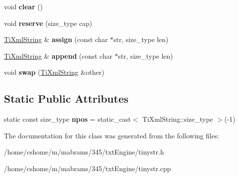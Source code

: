 \begin{DoxyCompactItemize}
\item 
\hypertarget{class_ti_xml_string_ab20e06e4c666abf3bdbfb3a1191d4888}{
void {\bfseries clear} ()}
\label{class_ti_xml_string_ab20e06e4c666abf3bdbfb3a1191d4888}

\item 
\hypertarget{class_ti_xml_string_a88ecf9f0f00cb5c67b6b637958d7049c}{
void {\bfseries reserve} (size\-\_\-type cap)}
\label{class_ti_xml_string_a88ecf9f0f00cb5c67b6b637958d7049c}

\item 
\hypertarget{class_ti_xml_string_ac72f3d9149b7812c1e6c59402014d0d5}{
\hyperlink{class_ti_xml_string}{\-Ti\-Xml\-String} \& {\bfseries assign} (const char $\ast$str, size\-\_\-type len)}
\label{class_ti_xml_string_ac72f3d9149b7812c1e6c59402014d0d5}

\item 
\hypertarget{class_ti_xml_string_ad44b21700d2ec24a511367b222b643fb}{
\hyperlink{class_ti_xml_string}{\-Ti\-Xml\-String} \& {\bfseries append} (const char $\ast$str, size\-\_\-type len)}
\label{class_ti_xml_string_ad44b21700d2ec24a511367b222b643fb}

\item 
\hypertarget{class_ti_xml_string_aa392cbc180752a79f007f4f9280c7762}{
void {\bfseries swap} (\hyperlink{class_ti_xml_string}{\-Ti\-Xml\-String} \&other)}
\label{class_ti_xml_string_aa392cbc180752a79f007f4f9280c7762}

\end{DoxyCompactItemize}
\subsection*{\-Static \-Public \-Attributes}
\begin{DoxyCompactItemize}
\item 
\hypertarget{class_ti_xml_string_a8f4422d227088dc7bec96f479b275d0a}{
static const size\-\_\-type {\bfseries npos} = static\-\_\-cast$<$ \-Ti\-Xml\-String\-::size\-\_\-type $>$(-\/1)}
\label{class_ti_xml_string_a8f4422d227088dc7bec96f479b275d0a}

\end{DoxyCompactItemize}


\-The documentation for this class was generated from the following files\-:\begin{DoxyCompactItemize}
\item 
/home/cshome/m/mabrams/345/txt\-Engine/tinystr.\-h\item 
/home/cshome/m/mabrams/345/txt\-Engine/tinystr.\-cpp\end{DoxyCompactItemize}
